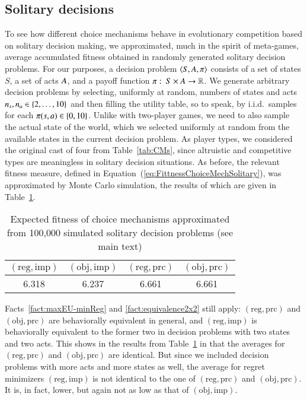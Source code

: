 \documentclass[fleqn,reqno,11pt]{article}
\begin{document}
\subsection{Solitary decisions}
\label{sec:solitary-decisions}

To see how different choice mechanisms behave in evolutionary competition based on solitary
decision making, we approximated, much in the spirit of meta-games, average accumulated
fitness obtained in randomly generated solitary decision problems. For our purposes, a decision
problem $\left \langle S, A, \pi\right\rangle$ consists of a set of states $S$, a set of acts $A$, and
a payoff function $\pi \thinspace \colon \thinspace S \times A \rightarrow \mathbb{R}$.  We generate arbitrary
decision problems by selecting, uniformly at random, numbers of states and acts
$n_s, n_a \in \left\{2, \dots, 10\right\}$ and then filling the utility table, so to speak, by
i.i.d.~samples for each $\pi(s, a) \in \left\{0, 10\right\}$. Unlike with
two-player games, we need to also sample the actual state of the world, which we selected
uniformly at random from the available states in the current decision problem. As player types,
we considered the original cast of four from Table~\ref{tab:CMs}, since altruistic and
competitive types are meaningless in solitary decision situations. As before, the
relevant fitness measure, defined in Equation~(\ref{eq:FittnessChoiceMechSolitary}), was
approximated by Monte Carlo simulation, the results of which are given in
Table~\ref{tab:SolitaryDecisions}.

\begin{table}
  \centering
  \begin{tabular}{cccc}
    \toprule
   $(\text{reg}, \text{imp})$ 
 & $(\text{obj}, \text{imp})$ 
 & $(\text{reg}, \text{prc})$ 
 & $(\text{obj}, \text{prc})$ 
 \\ \midrule
    6.318 & 6.237 & 6.661 & 6.661 \\ \bottomrule
  \end{tabular}
  \caption{Expected fitness of choice mechanisms approximated from 100,000 simulated solitary
    decision problems (see main text)}
  \label{tab:SolitaryDecisions}
\end{table}

Facts~\ref{fact:maxEU-minReg} and \ref{fact:equivalence2x2} still apply:
$(\text{reg}, \text{prc})$ and $(\text{obj}, \text{prc})$ are behaviorally equivalent in
general, and $(\text{reg}, \text{imp})$ is behaviorally equivalent to the former two in
decision problems with two states and two acts. This shows in the results from
Table~\ref{tab:SolitaryDecisions} in that the averages for $(\text{reg}, \text{prc})$ and
$(\text{obj}, \text{prc})$ are identical. But since we included decision problems with more
acts and more states as well, the average for regret minimizers $(\text{reg}, \text{imp})$ is
not identical to the one of $(\text{reg}, \text{prc})$ and $(\text{obj}, \text{prc})$. It
is, in fact, lower, but again not as low as that of $(\text{obj}, \text{imp})$.
\end{document}
